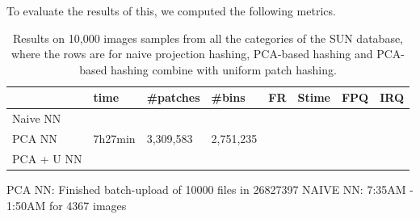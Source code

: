 To evaluate the results of this, we computed the following metrics.


\begin{table}
\begin{tabular}{ | l | l | l | l | l | l | l | l | }
\hline
& time & \#patches & \#bins & FR & Stime & FPQ & IRQ \\
\hline
Naive NN & & & & & & & \\
PCA NN & 7h27min & 3,309,583 & 2,751,235 & & & &  \\
PCA + U NN & & & & & & &\\
\hline
\end{tabular}
\caption{Results on 10,000 images samples from all
the categories of the SUN database, where the rows
are for naive projection hashing, PCA-based hashing and
PCA-based hashing combine with uniform patch hashing.}
\label{tb:nn-res}
\end{table}

PCA NN: Finished batch-upload of 10000 files in 26827397
NAIVE NN: 7:35AM - 1:50AM for 4367 images
